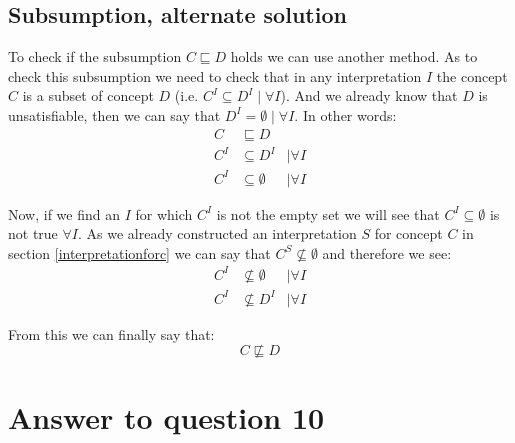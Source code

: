 \documentclass[a4paper,12pt]{article}
\begin{document}
\subsection[Alternate]{Subsumption, alternate solution}
To check if the subsumption $ C \sqsubseteq D $ holds we can use another
method.  As to check this subsumption we need to check that in any
interpretation $I$ the concept $C$ is a subset of concept $D$ (i.e. $ C^I
\subseteq D^I \mid \forall I$).  And we already know that $D$ is unsatisfiable,
then we can say that $ D^I = \emptyset \mid \forall I $.  In other words:
\begin{align*}
C   &\sqsubseteq D\\
C^I &\subseteq D^I        & \mid \forall I\\
C^I &\subseteq \emptyset  & \mid \forall I
\end{align*}

Now, if we find an $I$ for which $C^I$ is not the empty set we will see that $
C^I \subseteq \emptyset $ is not true $\forall I$.  As we already constructed
an interpretation $S$ for concept $C$ in section \ref{interpretationforc} we
can say that $ C^S \nsubseteq \emptyset $ and therefore we see:
\begin{align*}
C^I &\nsubseteq \emptyset  & \mid \forall I\\
C^I &\nsubseteq D^I        & \mid \forall I
\end{align*}

From this we can finally say that:
\begin{equation*}
C \not\sqsubseteq D
\end{equation*}

\section[Question 10]{Answer to question 10}
\end{document}
